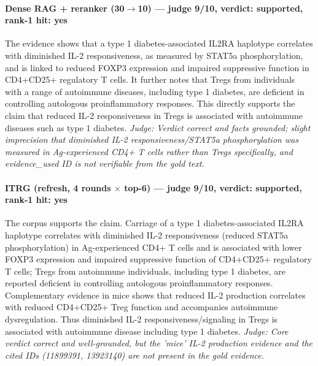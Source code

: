 \documentclass[sigconf, review, anonymous]{acmart}
\begin{document}
\paragraph{Dense RAG + reranker (30$\to$10) --- judge 9/10, verdict: supported, rank-1 hit: yes}
\noindent The evidence shows that a type 1 diabetes-associated IL2RA haplotype correlates with diminished IL-2 responsiveness, as measured by STAT5a phosphorylation, and is linked to reduced FOXP3 expression and impaired suppressive function in CD4+CD25+ regulatory T cells. It further notes that Tregs from individuals with a range of autoimmune diseases, including type 1 diabetes, are deficient in controlling autologous proinflammatory responses. This directly supports the claim that reduced IL-2 responsiveness in Tregs is associated with autoimmune diseases such as type 1 diabetes.
\noindent\small\textit{Judge: Verdict correct and facts grounded; slight imprecision that diminished IL-2 responsiveness/STAT5a phosphorylation was measured in Ag-experienced CD4+ T cells rather than Tregs specifically, and evidence\_used ID is not verifiable from the gold text.}
\paragraph{ITRG (refresh, 4 rounds $\times$ top-6) --- judge 9/10, verdict: supported, rank-1 hit: yes}
\noindent The corpus supports the claim. Carriage of a type 1 diabetes-associated IL2RA haplotype correlates with diminished IL-2 responsiveness (reduced STAT5a phosphorylation) in Ag-experienced CD4+ T cells and is associated with lower FOXP3 expression and impaired suppressive function of CD4+CD25+ regulatory T cells; Tregs from autoimmune individuals, including type 1 diabetes, are reported deficient in controlling autologous proinflammatory responses. Complementary evidence in mice shows that reduced IL-2 production correlates with reduced CD4+CD25+ Treg function and accompanies autoimmune dysregulation. Thus diminished IL-2 responsiveness/signaling in Tregs is associated with autoimmune disease including type 1 diabetes.
\noindent\small\textit{Judge: Core verdict correct and well-grounded, but the 'mice' IL-2 production evidence and the cited IDs (11899391, 13923140) are not present in the gold evidence.}
\end{document}
